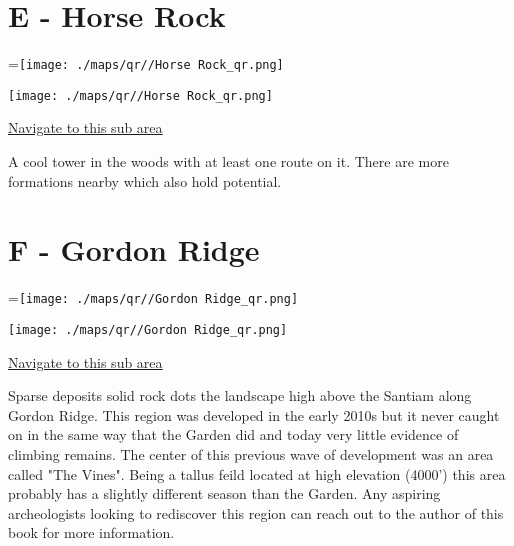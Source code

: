 \begin{multicols}{2}
\needspace{6em}

\section{E - Horse Rock}\label{sa:Horse Rock}
=\hbox{\texttt{[image: ./maps/qr//Horse Rock\_qr.png]}}%
\begin{center}
\texttt{[image: ./maps/qr//Horse Rock\_qr.png]}
\end{center}
\begin{center}
\underline{\textcolor{blue}{\href{http://maps.google.com/maps?q=44.31343,-122.33943}{Navigate to this sub area}}}
\end{center}


A cool tower in the woods with at least one route on it. There are more formations nearby which also hold potential.\\




\needspace{6em}

\section{F - Gordon Ridge}\label{sa:Gordon Ridge}
=\hbox{\texttt{[image: ./maps/qr//Gordon Ridge\_qr.png]}}%
\begin{center}
\texttt{[image: ./maps/qr//Gordon Ridge\_qr.png]}
\end{center}
\begin{center}
\underline{\textcolor{blue}{\href{http://maps.google.com/maps?q=44.34844,-122.34942}{Navigate to this sub area}}}
\end{center}


Sparse deposits solid rock dots the landscape high above the Santiam along Gordon Ridge. This region was developed in the early 2010s but it never caught on in the same way that the Garden did and today very little evidence of climbing remains. The center of this previous wave of development was an area called "The Vines". Being a tallus feild located at high elevation (4000') this area probably has a slightly different season than the Garden. Any aspiring archeologists looking to rediscover this region can reach out to the author of this book for more information.\\





\end{multicols}
